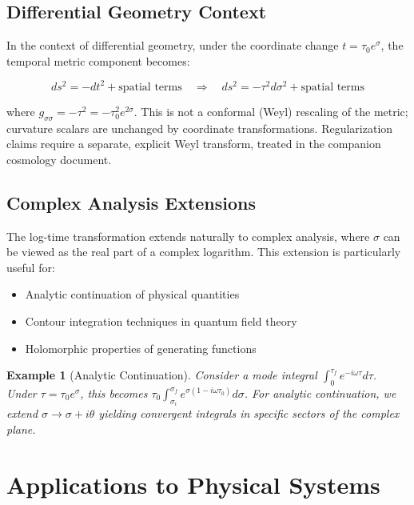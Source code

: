 \documentclass[11pt,a4paper]{article}
\newtheorem{example}[theorem]{Example}
\begin{document}
\subsection{Differential Geometry Context}

In the context of differential geometry, under the coordinate change $t = \tau_0 e^{\sigma}$, the temporal metric component becomes:

\begin{equation}
ds^2 = -dt^2 + \text{spatial terms} \quad \Rightarrow \quad ds^2 = -\tau^2 d\sigma^2 + \text{spatial terms}
\end{equation}

where $g_{\sigma\sigma} = -\tau^2 = -\tau_0^2 e^{2\sigma}$. This is not a conformal (Weyl) rescaling of the metric; curvature scalars are unchanged by coordinate transformations. Regularization claims require a separate, explicit Weyl transform, treated in the companion cosmology document.

\subsection{Complex Analysis Extensions}

The log-time transformation extends naturally to complex analysis, where $\sigma$ can be viewed as the real part of a complex logarithm. This extension is particularly useful for:

\begin{itemize}
\item Analytic continuation of physical quantities
\item Contour integration techniques in quantum field theory
\item Holomorphic properties of generating functions
\end{itemize}

\begin{example}[Analytic Continuation]
Consider a mode integral $\int_0^{\tau_f} e^{-i\omega\tau} d\tau$. Under $\tau = \tau_0 e^{\sigma}$, this becomes $\tau_0 \int_{\sigma_i}^{\sigma_f} e^{\sigma(1-i\omega\tau_0)} d\sigma$. For analytic continuation, we extend $\sigma \to \sigma + i\theta$ yielding convergent integrals in specific sectors of the complex plane.
\end{example}

\section{Applications to Physical Systems}
\end{document}
